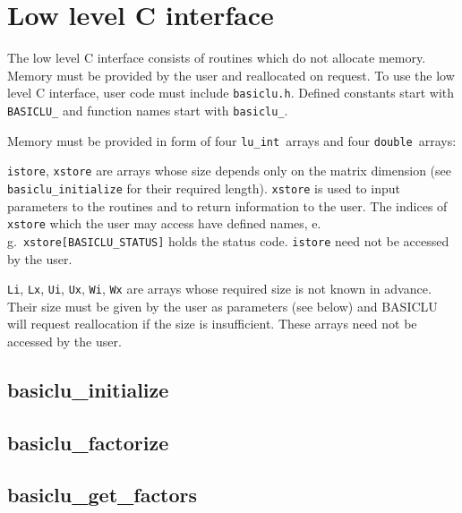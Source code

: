 \documentclass{article}
\newcommand{\ct}{\texttt}
\newcommand{\luint}{\ct{lu\_int}}
\newcommand{\double}{\ct{double}}
\begin{document}
\section{Low level C interface}
The low level C interface consists of routines which do not allocate memory.
Memory must be provided by the user and reallocated on request. To use the low
level C interface, user code must include \ct{basiclu.h}. Defined constants
start with \ct{BASICLU\_} and function names start with \ct{basiclu\_}.

Memory must be provided in form of four \luint\ arrays and four \double\ arrays:
\begin{description}
\item{\ct{istore}, \ct{xstore}} are arrays whose size depends only on the matrix
  dimension (see \ct{basiclu\_initialize} for their required length).
  \ct{xstore} is used to input parameters to the routines and to return
  information to the user. The indices of \ct{xstore} which the user may access
  have defined names, e.\,g.\ \ct{xstore[BASICLU\_STATUS]} holds the status
  code. \ct{istore} need not be accessed by the user.
\item{\ct{Li}, \ct{Lx}, \ct{Ui}, \ct{Ux}, \ct{Wi}, \ct{Wx}} are arrays whose
  required size is not known in advance. Their size must be given by the user
  as parameters (see below) and BASICLU will request reallocation if the size is
  insufficient. These arrays need not be accessed by the user.
\end{description}

\newpage
\subsection{basiclu\_initialize}
{\footnotesize

}

\newpage
\subsection{basiclu\_factorize}
{\footnotesize

}

\newpage
\subsection{basiclu\_get\_factors}
{\footnotesize

}
\end{document}
